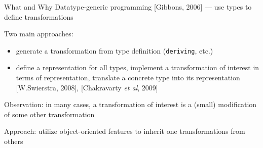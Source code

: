 \documentclass{beamer}
\theoremstyle{definition}
\theoremstyle{plain} %
\begin{document}
\begin{comment}
  In our work we present a ``happy marriage'' of object-oriented and functional approaches to generic programming in OCaml. Our framework
  allows to define datatype-generic functions, which can be used in convenient combinator way. However, under the hood the
  implementation uses object-orientd encoding. Thus, new transformations can be derived from existing ones with a massive
  reuse. There are also other useful properties --- all transformations are instances of the same scheme, only one
  generic function per type is required, our approach is compatible with other means of code reuse, such as polymorphic variants.
\end{comment}

\begin{frame}[fragile]{What and Why}
  Datatype-generic programming [Gibbons, 2006] --- use types to define transformations  
  \vskip5mm
  
  Two main approaches:

  \begin{itemize}
    \item generate a transformation from type definition (\lstinline[basicstyle=\large]|deriving|, etc.)
    \item define a representation for all types, implement a transformation of interest in terms of representation, translate a concrete
      type into its representation [W.Swierstra, 2008], [Chakravarty \emph{et al}, 2009]
  \end{itemize}
  \vskip5mm
  
  Observation: in many cases, a transformation of interest is a (small) modification of some other transformation
  \vskip5mm
  
  Approach: utilize object-oriented features to inherit one transformations from others
\end{frame}


\end{document}

